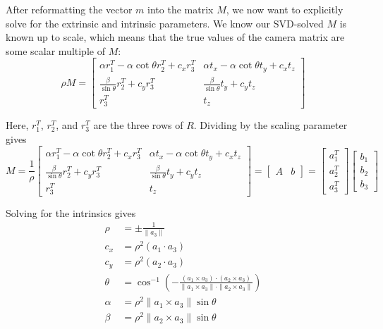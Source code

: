 \documentclass[a4paper, 12pt]{article}
\begin{document}
After reformatting the vector $m$ into the matrix $M$, we now want to explicitly solve for the extrinsic and intrinsic parameters. We know our SVD-solved $M$ is known up to scale, which means that the true values of the camera matrix are some scalar multiple of $M$:
\begin{equation}
\rho M = \begin{bmatrix}
\alpha r_1^T - \alpha\cot \theta r_2^T + c_xr_3^T & \alpha t_x - \alpha \cot \theta t_y + c_x t_z \\
\frac{\beta}{\sin\theta}r_2^T + c_yr_3^T & \frac{\beta}{\sin\theta}t_y + c_yt_z \\ r_3^T & t_z
\end{bmatrix}
\end{equation}

Here, $r_1^T$, $r_2^T$, and $r_3^T$ are the three rows of $R$. Dividing by the scaling parameter gives
\[M = \frac{1}{\rho}\begin{bmatrix}
\alpha r_1^T - \alpha\cot \theta r_2^T + c_xr_3^T & \alpha t_x - \alpha \cot \theta t_y + c_x t_z \\
\frac{\beta}{\sin\theta}r_2^T + c_yr_3^T & \frac{\beta}{\sin\theta}t_y + c_yt_z \\ r_3^T & t_z
\end{bmatrix} = \begin{bmatrix}A & b\end{bmatrix} =\begin{bmatrix}
a_1^T \\ a_2^T \\ a_3^T
\end{bmatrix} \begin{bmatrix}
b_1\\b_2\\b_3
\end{bmatrix}
\]

Solving for the intrinsics gives 
\begin{equation}\begin{aligned}
    \rho &= \pm \frac{1}{\|a_3\|}\\
    c_x &= \rho^2(a_1\cdot a_3)\\
    c_y &=\rho^2(a_2\cdot a_3)\\
    \theta &= \cos ^{-1} \left(-\frac{(a_1 \times a_3)\cdot(a_2\times a_3)}{\|a_1\times a_3\|\cdot\|a_2\times a_3\|}\right)\\
    \alpha &= \rho^2 \|a_1 \times a_3\| \sin \theta\\
    \beta &= \rho^2 \|a_2 \times a_3\| \sin \theta
\end{aligned}\end{equation}
\end{document}
